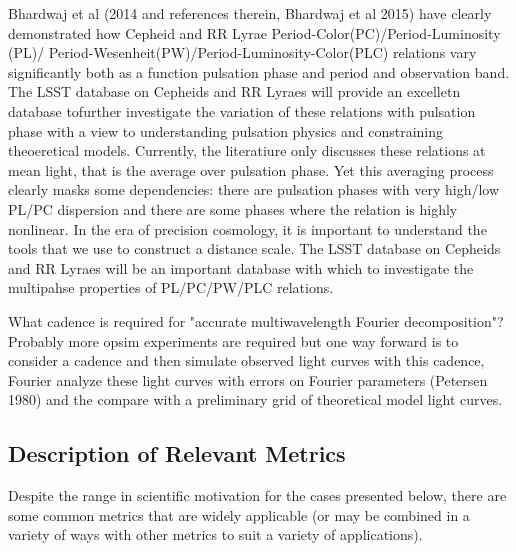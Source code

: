 Bhardwaj et al (2014 and references therein, Bhardwaj et al 2015) have clearly demonstrated how Cepheid and RR Lyrae
Period-Color(PC)/Period-Luminosity (PL)/
Period-Wesenheit(PW)/Period-Luminosity-Color(PLC) relations vary significantly both as a function pulsation phase and period and observation band. 
The LSST database on Cepheids and RR Lyraes will provide an excelletn database tofurther investigate the variation of these relations with pulsation phase
with a view to understanding pulsation physics and constraining theoeretical models. Currently, the literatiure only
discusses these relations at mean light, that is the average over pulsation phase. Yet this averaging process clearly masks some
dependencies: there are pulsation phases with very high/low PL/PC dispersion and there are some phases where the relation is highly nonlinear.
In the era of precision cosmology, it is important to understand the tools that we use to construct a distance scale. The LSST database on
Cepheids and RR Lyraes will be an important database with which to investigate the multipahse properties of PL/PC/PW/PLC relations.

What cadence is required for "accurate multiwavelength Fourier decomposition"? 
Probably more opsim experiments are required but one way forward is to consider a cadence and then simulate observed light curves with this 
cadence, Fourier analyze these light curves with errors on Fourier parameters (Petersen 1980) and the compare with a preliminary grid
of theoretical model light curves.



\subsection{Description of Relevant Metrics}
\label{sec:\secname:variablemetrics}

Despite the range in scientific motivation for the cases presented below, there are some common metrics that are widely applicable (or may be combined in a variety of ways with other metrics to suit a variety of applications).


